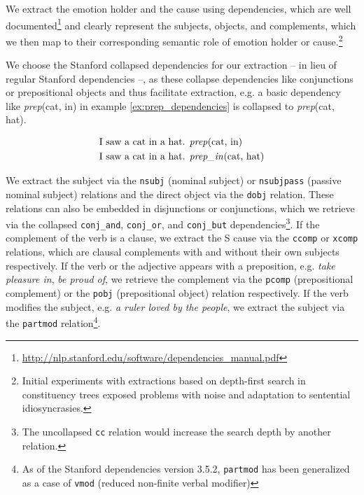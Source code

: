 We extract the emotion holder and the cause using dependencies, which are well documented\footnote{\url{http://nlp.stanford.edu/software/dependencies\_manual.pdf}} and clearly represent the subjects, objects, and complements, which we then map to their corresponding semantic role of emotion holder or cause.\footnote{Initial experiments with extractions based on depth-first search in constituency trees exposed problems with noise and adaptation to sentential idiosyncrasies.}

We choose the Stanford collapsed dependencies for our extraction -- in lieu of regular Stanford dependencies --, as these collapse dependencies like conjunctions or prepositional objects and thus facilitate extraction, e.g. a basic dependency like \textit{prep}(cat, in) in example \ref{ex:prep_dependencies} is collapsed to \textit{prep}(cat, hat).

\begin{align}
\begin{split}\label{ex:prep_dependencies}
&\textnormal{I saw a cat in a hat. \textit{prep}(cat, in)}\\
&\textnormal{I saw a cat in a hat. \textit{prep\_in}(cat, hat)}
\end{split}
\end{align}

We extract the subject via the \texttt{nsubj} (nominal subject) or \texttt{nsubjpass} (passive nominal subject) relations and the direct object via the \texttt{dobj} relation. These relations can also be embedded in disjunctions or conjunctions, which we retrieve via the collapsed \texttt{conj\_and}, \texttt{conj\_or}, and \texttt{conj\_but} dependencies\footnote{The uncollapsed \texttt{cc} relation would increase the search depth by another relation.}. If the complement of the verb is a clause, we extract the S cause via the \texttt{ccomp} or \texttt{xcomp} relations, which are clausal complements with and without their own subjects respectively. If the verb or the adjective appears with a preposition, e.g. \textit{take pleasure in}, \textit{be proud of}, we retrieve the complement via the \texttt{pcomp} (prepositional complement) or the \texttt{pobj} (prepositional object) relation respectively. If the verb modifies the subject, e.g. \textit{a ruler loved by the people}, we extract the subject via the \texttt{partmod} relation\footnote{As of the Stanford dependencies version 3.5.2, \texttt{partmod} has been generalized as a case of \texttt{vmod} (reduced non-finite verbal modifier)}.

